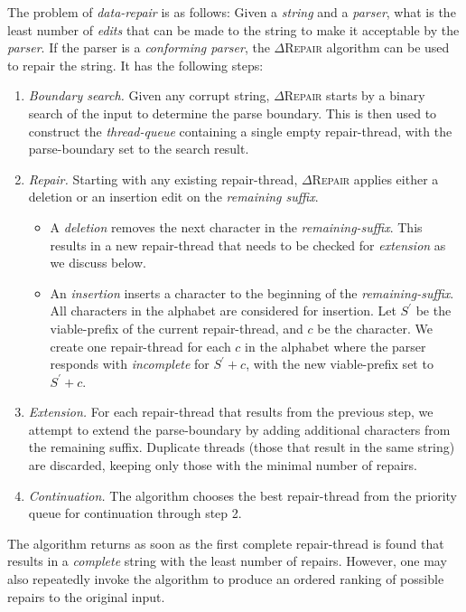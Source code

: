 \documentclass[acmsmall,screen,review,anonymous]{acmart}
\newcommand{\approach}{\textsc{$\Delta$Repair}\xspace}
\newcommand{\drepair}{\approach}
\begin{document}
The problem of \emph{data-repair} is as follows: Given a \emph{string} and a
\emph{parser}, what is the least number of \emph{edits} that can be made to
the string to make it acceptable by the \emph{parser}. If the parser is a
\emph{conforming parser}, the \drepair algorithm can be used to
repair the string. It has the following steps:

\begin{enumerate}
\item \emph{Boundary search.} Given any corrupt string, \drepair starts by a
binary search of the input to determine the parse boundary. This is then used
to construct the \emph{thread-queue} containing a single empty repair-thread,
with the parse-boundary set to the search result.

\item \emph{Repair.} Starting with any existing repair-thread, \drepair applies
either a deletion or an insertion edit on the \emph{remaining suffix}.
\begin{itemize}
\item A \emph{deletion} removes the next character in the \emph{remaining-suffix}.
This results in a new repair-thread that needs to be checked for \emph{extension} as we discuss below.
\item An \emph{insertion} inserts a character to the beginning of the \emph{remaining-suffix}.
All characters in the alphabet are considered for insertion.
Let $S^{'}$ be the viable-prefix of the current repair-thread, and $c$ be the character.
We create one repair-thread for each $c$ in the alphabet where the parser
responds with \emph{incomplete} for $S^{'}+c$, with the new viable-prefix set to $S^{'}+c$.
\end{itemize}
\item \emph{Extension.} For each repair-thread that results from the previous step,
we attempt to extend the parse-boundary by adding additional characters from the
remaining suffix. Duplicate threads (those that result in the same string) are discarded,
keeping only those with the minimal number of repairs.
\item \emph{Continuation.} The algorithm chooses the best repair-thread from the priority queue
for continuation through step 2.
\end{enumerate}

The algorithm returns as soon as the first complete repair-thread is found that results
in a \emph{complete} string with the least number of repairs.
However, one may also repeatedly invoke the algorithm to produce an ordered
ranking of possible repairs to the original input.
\end{document}
